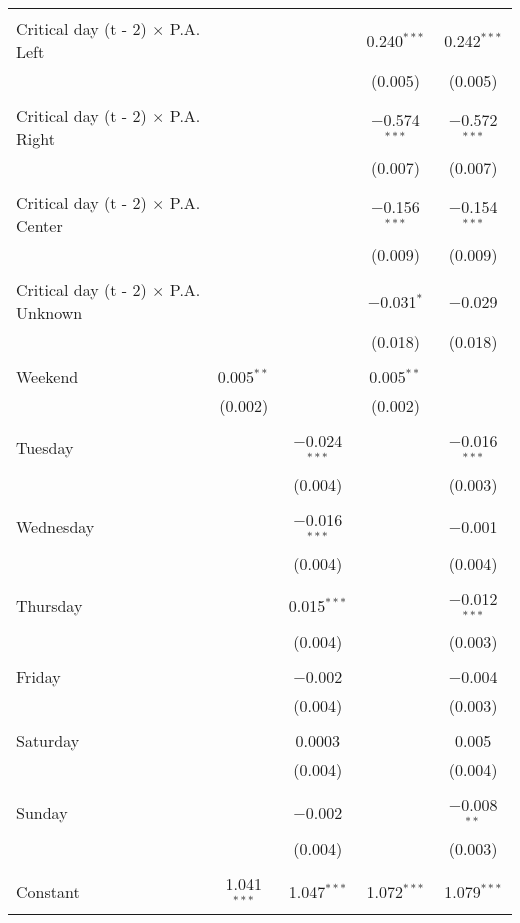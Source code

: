 \documentclass[
]{article}
\begin{document}
\begin{table}[!htbp]
{\begin{tabular}{@{\extracolsep{5pt}}lcccc}
  & & & & \\ 
 Critical day (t - 2) $\times$ P.A. Left &  &  & 0.240$^{***}$ & 0.242$^{***}$ \\ 
  &  &  & (0.005) & (0.005) \\ 
  & & & & \\ 
 Critical day (t - 2) $\times$ P.A. Right &  &  & $-$0.574$^{***}$ & $-$0.572$^{***}$ \\ 
  &  &  & (0.007) & (0.007) \\ 
  & & & & \\ 
 Critical day (t - 2) $\times$ P.A. Center &  &  & $-$0.156$^{***}$ & $-$0.154$^{***}$ \\ 
  &  &  & (0.009) & (0.009) \\ 
  & & & & \\ 
 Critical day (t - 2) $\times$ P.A. Unknown &  &  & $-$0.031$^{*}$ & $-$0.029 \\ 
  &  &  & (0.018) & (0.018) \\ 
  & & & & \\ 
 Weekend & 0.005$^{**}$ &  & 0.005$^{**}$ &  \\ 
  & (0.002) &  & (0.002) &  \\ 
  & & & & \\ 
 Tuesday &  & $-$0.024$^{***}$ &  & $-$0.016$^{***}$ \\ 
  &  & (0.004) &  & (0.003) \\ 
  & & & & \\ 
 Wednesday &  & $-$0.016$^{***}$ &  & $-$0.001 \\ 
  &  & (0.004) &  & (0.004) \\ 
  & & & & \\ 
 Thursday &  & 0.015$^{***}$ &  & $-$0.012$^{***}$ \\ 
  &  & (0.004) &  & (0.003) \\ 
  & & & & \\ 
 Friday &  & $-$0.002 &  & $-$0.004 \\ 
  &  & (0.004) &  & (0.003) \\ 
  & & & & \\ 
 Saturday &  & 0.0003 &  & 0.005 \\ 
  &  & (0.004) &  & (0.004) \\ 
  & & & & \\ 
 Sunday &  & $-$0.002 &  & $-$0.008$^{**}$ \\ 
  &  & (0.004) &  & (0.003) \\ 
  & & & & \\ 
 Constant & 1.041$^{***}$ & 1.047$^{***}$ & 1.072$^{***}$ & 1.079$^{***}$ \\ 

\end{tabular}}
\end{table}
\end{document}
